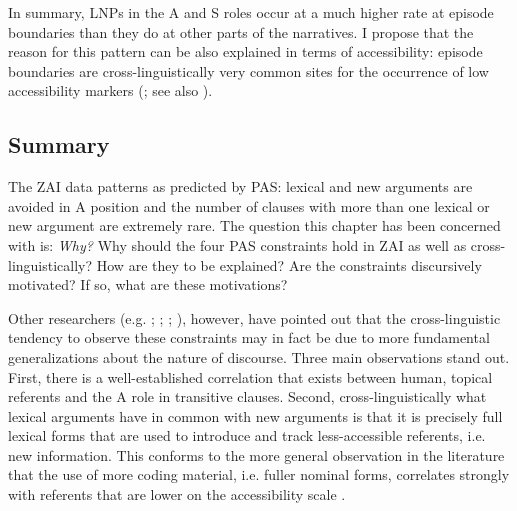 In summary, LNPs in the A and S roles occur at a much higher rate at episode boundaries than they do at other parts of the narratives. I propose that the reason for this pattern can be also explained in terms of accessibility: episode boundaries are cross-linguistically very common sites for the occurrence of low accessibility markers (\citealt[52]{ariel2001}; see also \citealt{downing1980}).


\subsection{Summary}\label{discussion}

The ZAI data patterns as predicted by PAS: lexical and new arguments are avoided in A position and the number of clauses with more than one lexical or new argument are extremely rare. The question this chapter has been concerned with is: \textit{Why?} Why should the four PAS constraints hold in ZAI as well as cross-linguistically? How are they to be explained? Are the constraints discursively motivated? If so, what are these motivations? 


Other researchers (e.g. \citealt{haspelmath2006}; \citealt{everett2009}; \citealt{haig2016}; \citealt{schnell2017}), however, have pointed out that the cross-linguistic tendency to observe these constraints may in fact be due to more fundamental generalizations about the nature of discourse. Three main observations stand out. First, there is a well-established correlation that exists between human, topical referents and the A role in transitive clauses. Second, cross-linguistically what lexical arguments have in common with new arguments is that it is precisely full lexical forms that are used to introduce and track less-accessible \citep{ariel1990} referents, i.e. new information. This conforms to the more general observation in the literature that the use of more coding material, i.e. fuller nominal forms, correlates strongly with referents that are lower on the accessibility scale \citep{givon1983}. 

